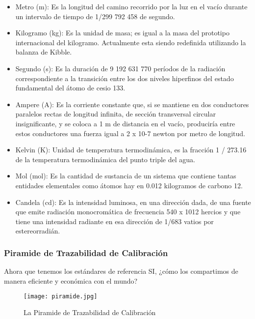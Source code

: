		\begin{itemize}
			\item  Metro (m): Es la longitud del camino recorrido por la luz en el vacío durante un intervalo de tiempo de 1/299 792 458 de segundo.
			
			\item Kilogramo (kg): Es la unidad de masa; es igual a la masa del prototipo internacional del kilogramo. Actualmente esta siendo redefinida utilizando la balanza de Kibble.
			
			\item Segundo (s): Es la duración de 9 192 631 770 períodos de la radiación correspondiente a la transición entre los dos niveles hiperfinos del estado fundamental del átomo de cesio 133.
			
\clearpage
\thispagestyle{plain}

			\item Ampere (A): Es la corriente constante que, si se mantiene en dos conductores paralelos rectas de longitud infinita, de sección transversal circular insignificante, y se coloca a 1 m de distancia en el vacío, produciría entre estos conductores una fuerza igual a 2 x 10-7 newton por metro de longitud.
			
			\item Kelvin (K): Unidad de temperatura termodinámica, es la fracción 1 / 273.16 de la temperatura termodinámica del punto triple del agua.
			
			\item Mol (mol): Es la cantidad de sustancia de un sistema que contiene tantas entidades elementales como átomos hay en 0.012 kilogramos de carbono 12.
			
			\item Candela (cd): Es la intensidad luminosa, en una dirección dada, de una fuente que emite radiación monocromática de frecuencia 540 x 1012 hercios y que tiene una intensidad radiante en esa dirección de 1/683 vatios por estereorradián.
		\end{itemize}
		
	\subsubsection{Piramide de Trazabilidad de Calibración}
		\par 
			Ahora que tenemos los estándares de referencia SI, ¿cómo los compartimos de manera eficiente y económica con el mundo?
			
		\begin{figure}[h]
			\centering
			\texttt{[image: piramide.jpg]}
			\caption{La Piramide de Trazabilidad de Calibración}
		\end{figure}
		
